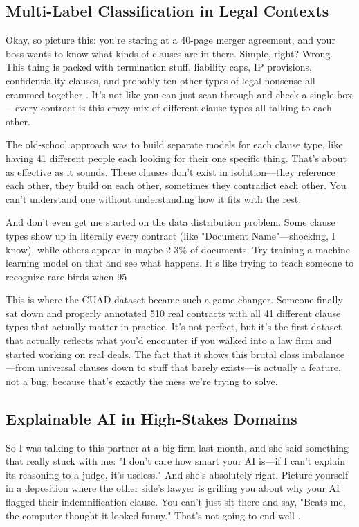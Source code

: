 \subsection{Multi-Label Classification in Legal Contexts}

Okay, so picture this: you're staring at a 40-page merger agreement, and your boss wants to know what kinds of clauses are in there. Simple, right? Wrong. This thing is packed with termination stuff, liability caps, IP provisions, confidentiality clauses, and probably ten other types of legal nonsense all crammed together \cite{liu2021multilabel}. It's not like you can just scan through and check a single box—every contract is this crazy mix of different clause types all talking to each other. 

The old-school approach was to build separate models for each clause type, like having 41 different people each looking for their one specific thing. That's about as effective as it sounds. These clauses don't exist in isolation—they reference each other, they build on each other, sometimes they contradict each other. You can't understand one without understanding how it fits with the rest.

And don't even get me started on the data distribution problem. Some clause types show up in literally every contract (like "Document Name"—shocking, I know), while others appear in maybe 2-3\% of documents. Try training a machine learning model on that and see what happens. It's like trying to teach someone to recognize rare birds when 95%

This is where the CUAD dataset \cite{hendrycks2021cuad} became such a game-changer. Someone finally sat down and properly annotated 510 real contracts with all 41 different clause types that actually matter in practice. It's not perfect, but it's the first dataset that actually reflects what you'd encounter if you walked into a law firm and started working on real deals. The fact that it shows this brutal class imbalance—from universal clauses down to stuff that barely exists—is actually a feature, not a bug, because that's exactly the mess we're trying to solve.

\subsection{Explainable AI in High-Stakes Domains}

So I was talking to this partner at a big firm last month, and she said something that really stuck with me: "I don't care how smart your AI is—if I can't explain its reasoning to a judge, it's useless." And she's absolutely right. Picture yourself in a deposition where the other side's lawyer is grilling you about why your AI flagged their indemnification clause. You can't just sit there and say, "Beats me, the computer thought it looked funny." That's not going to end well \cite{molnar2020interpretable}.

